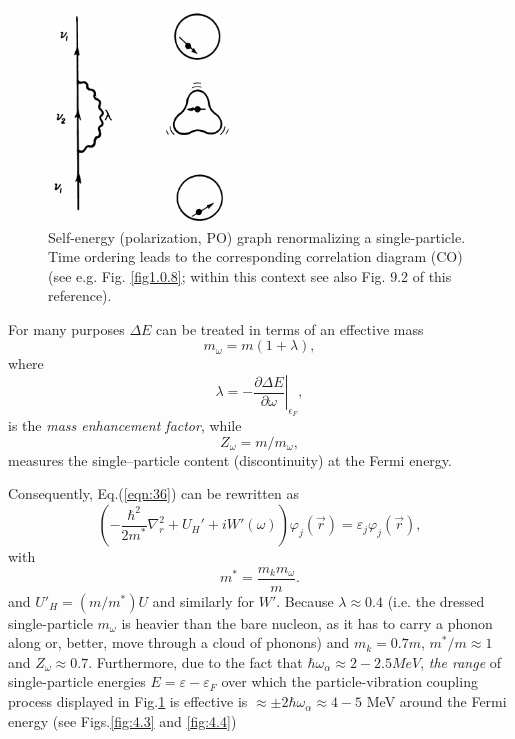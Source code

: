 \begin{figure}[h!]
\centerline {
\includegraphics*[width=5cm]{introduccion/figs/figintroD2}
}
\caption{Self-energy (polarization, PO) graph renormalizing  a single-particle. Time ordering leads to the corresponding correlation diagram (CO) (see e.g. Fig. \ref{fig1.0.8}; within this context see also \cite{Brink:05} Fig. 9.2 of this reference).}
\label{fig:4.2}
\end{figure}
For many purposes $\Delta E$ can be treated in terms of an effective mass
\begin{equation}
m_{\omega} = m(1+\lambda),
\label{eqn:38}
\end{equation}
where
\begin{equation}
\lambda= \left.- \frac{\partial \Delta E}{\partial \omega}\right|_{\epsilon_F},
\label{eqn:39}
\end{equation}
is the {\it mass enhancement factor}, while
\begin{equation}
\nonumber
Z_{\omega}=m/m_{\omega},
\end{equation}
measures the single--particle content (discontinuity) at the Fermi energy.

Consequently, Eq.(\ref{eqn:36}) can be rewritten as
\begin{equation}
\left( - \frac{\hbar^2}{2m^*} \nabla_r^2 + U_H' + i W'(\omega) \right) \varphi_j(\vec{r}) = \varepsilon_j \varphi_j(\vec{r}),
\label{eqn:40a}
\end{equation}
with
\begin{equation}
m^* = \frac{m_k m_{\omega}}{m} .
\label{eqn:40b}
\end{equation}
 and $U'_H = (m/m^*) U$ and similarly for $W'$. Because $\lambda \approx 0.4$ (i.e. the dressed single-particle $m_{\omega}$ is heavier than the bare nucleon, as it has to carry a phonon along or, better, move through a cloud of phonons) and $m_k=0.7m$, $m^*/m \approx 1$ and $Z_{\omega} \approx 0.7$. Furthermore, due to the fact that $\hbar \omega_{\alpha} \approx 2-2.5 MeV$, {\it the range} of single-particle energies $E=\varepsilon-\varepsilon_F$ over which the particle-vibration coupling process displayed in Fig.\ref{fig:4.2} is effective is $\approx \pm 2\hbar \omega_{\alpha} \approx 4-5$ MeV around the Fermi energy (see Figs.\ref{fig:4.3} and \ref{fig:4.4})

